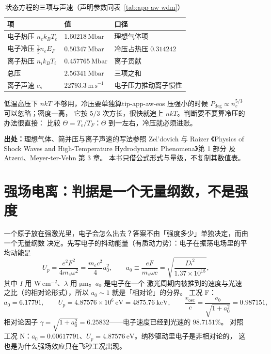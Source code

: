 \begin{table}[htbp]
\centering
\small
\caption{状态方程的三项与声速（声明参数同表~\ref{tab:app-aw-wdm}）}
\label{tab:app-aw-eos}
\begin{tabular}{p{4.4cm}p{4.0cm}p{4.4cm}}
\hline
项 & 值 & 口径 \\
\hline
电子热压 $n_ek_BT_e$ & $1.60218\ \mathrm{Mbar}$ & 理想气体项 \\
电子冷压 $\frac{2}{5}n_eE_F$ & $0.50347\ \mathrm{Mbar}$ & 冷压占热压 $0.314242$ \\
离子热压 $n_ik_BT_i$ & $0.457765\ \mathrm{Mbar}$ & 离子贡献 \\
总压 & $2.56341\ \mathrm{Mbar}$ & 三项之和 \\
离子声速 $c_s$ & $22793.3\ \mathrm{m\,s^{-1}}$ & 电子压力推动离子惯性 \\
\hline
\end{tabular}
\end{table}

\begin{tip}{低温高压下 $nkT$ 不够用，冷压要单独算}{tip-app-aw-eos}
压强小的时候 $P_\mathrm{deg}\propto n_e^{5/3}$ 可以忽略；密度一高，
它按 $5/3$ 次方长，很快就追上 $nkT$。判断要不要算冷压的办法很直接：
比较 $\Theta=T_e/T_F$：$\Theta$ 到一左右，冷压就必须进账。
\end{tip}

{\footnotesize
\textbf{出处：}理想气体、简并压与离子声速的写法参照 Zel'dovich 与 Raizer
《Physics of Shock Waves and High-Temperature Hydrodynamic Phenomena》第 1 部分
及 Atzeni、Meyer-ter-Vehn 第 3 章。
本书只借公式形式与量级，不复制其数值表。
}

\section{强场电离：判据是一个无量纲数，不是强度}
\label{sec:app-aw-field}

一个原子放在强激光里，电子会怎么出去？答案不由「强度多少」单独决定，而由一个无量纲数
决定。先写电子的抖动能量（有质动力势）：电子在振荡电场里的平均动能是
\begin{equation}
U_p=\frac{e^2F^2}{4m_e\omega^2}=\frac{m_ec^2}{4}a_0^2,
\qquad
a_0\equiv\frac{eF}{m_e\omega c}=\sqrt{\frac{I\lambda^2}{1.37\times10^{18}}},
\label{eq:app-aw-up}
\end{equation}
其中 $I$ 用 $\mathrm{W\,cm^{-2}}$、$\lambda$ 用 $\mathrm{\mu m}$。$a_0$ 是电子在一个
激光周期内被推到的速度与光速之比（的相对论形式），所以 $a_0\sim1$ 就是「相对论」的分界。
工况 F：
\begin{equation}
a_0=6.17791,\qquad
U_p=4.87576\times10^{6}\ \mathrm{eV}=4875.76\ \mathrm{keV},\qquad
\frac{v_\mathrm{osc}}{c}=\frac{a_0}{\sqrt{1+a_0^2}}=0.987151,
\label{eq:app-aw-a0}
\end{equation}
相对论因子 $\gamma=\sqrt{1+a_0^2}=6.25832$——电子速度已经到光速的 $98.7151\%$。
对照工况 N：$a_0=0.00617791$、$U_p=4.87576\ \mathrm{eV}$。纳秒驱动里电子是非相对论的，
这也是为什么强场效应只在飞秒工况出现。

